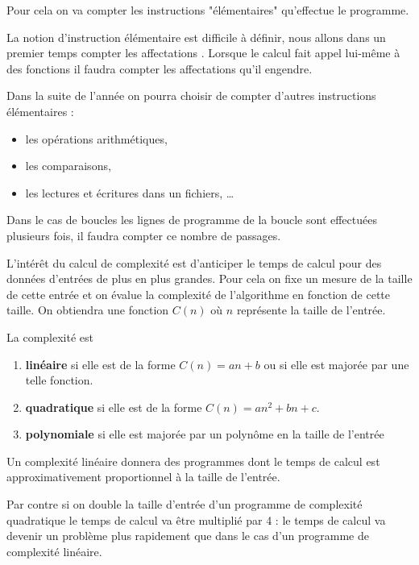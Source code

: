 Pour cela on va compter les instructions "élémentaires" qu'effectue le programme.

La notion d'instruction élémentaire est difficile à définir, nous allons dans un premier temps compter les affectations . 
Lorsque le calcul fait appel lui-même à des fonctions il faudra compter les affectations qu'il engendre.

\medskip{}

Dans la suite de l'année on pourra choisir de compter d'autres instructions élémentaires :
\begin{itemize}
  \item les opérations arithmétiques,
  \item les comparaisons,
  \item les lectures et écritures dans un fichiers, \dots
\end{itemize}

Dans le cas de boucles les lignes de programme de la boucle sont effectuées plusieurs fois, il faudra compter ce nombre de passages.

L'intérêt du calcul de complexité est d'anticiper le temps de calcul pour des données d'entrées de plus en plus grandes. Pour cela on fixe un mesure de la taille de cette entrée et on évalue la complexité de l'algorithme en fonction de cette taille. On obtiendra une fonction $C(n)$ où $n$ représente la taille de l'entrée.
\begin{defin}[Complexités] La complexité est

\begin{enumerate}
  \item {\bf linéaire} si elle est de la forme $C(n)= an+b$ ou si elle est majorée par une telle fonction. 
  \item {\bf quadratique} si elle est de la forme $C(n)= an^2+bn+c$. 
  \item {\bf polynomiale} si elle est majorée par un polynôme en la taille de l'entrée
\end{enumerate}
\end{defin}
Un complexité linéaire donnera des programmes dont le temps de calcul est approximativement proportionnel à la taille de l'entrée.

Par contre si on double la taille d'entrée d'un programme de complexité quadratique le temps de calcul va être multiplié par 4 : le temps de calcul va devenir un problème plus rapidement que dans le cas d'un programme de complexité linéaire.


